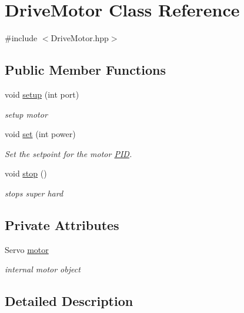 \hypertarget{classDriveMotor}{\section{Drive\-Motor Class Reference}
\label{classDriveMotor}
}


{\ttfamily \#include $<$Drive\-Motor.\-hpp$>$}

\subsection*{Public Member Functions}
\begin{DoxyCompactItemize}
\item 
void \hyperlink{classDriveMotor_aac017793d1fc4a5b0c75d6f1bc507230}{setup} (int port)
\begin{DoxyCompactList}\small\item\em setup motor \end{DoxyCompactList}\item 
void \hyperlink{classDriveMotor_a616b2eb611ddc4862d2d52103bb7aadc}{set} (int power)
\begin{DoxyCompactList}\small\item\em Set the setpoint for the motor \hyperlink{classPID}{P\-I\-D}. \end{DoxyCompactList}\item 
void \hyperlink{classDriveMotor_af40ee6f659e9512e2af2c8e7df07218e}{stop} ()
\begin{DoxyCompactList}\small\item\em stops super hard \end{DoxyCompactList}\end{DoxyCompactItemize}
\subsection*{Private Attributes}
\begin{DoxyCompactItemize}
\item 
Servo \hyperlink{classDriveMotor_a27de76439b7bd1035b17faf78be59478}{motor}
\begin{DoxyCompactList}\small\item\em internal motor object \end{DoxyCompactList}\end{DoxyCompactItemize}


\subsection{Detailed Description}


